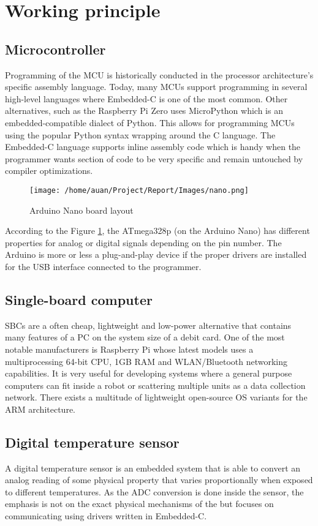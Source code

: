 \section{Working principle}%
\label{sec:working_principle}

\subsection{Microcontroller}%
\label{sub:microcontroller}
Programming of the MCU is historically conducted in the processor architecture's specific assembly language. Today, many MCUs support programming in several high-level languages where Embedded-C is one of the most common. Other alternatives, such as the Raspberry Pi Zero uses MicroPython which is an embedded-compatible dialect of Python. This allows for programming MCUs using the popular Python syntax wrapping around the C language. The Embedded-C language supports inline assembly code which is handy when the programmer wants section of code to be very specific and remain untouched by compiler optimizations.

\begin{figure}[h]
  \centering
  \texttt{[image: /home/auan/Project/Report/Images/nano.png]}
  \caption{Arduino Nano board layout}
  \label{fig:nano}
\end{figure}

According to the Figure \ref{fig:nano}, the ATmega328p (on the Arduino Nano) has different properties for analog or digital signals depending on the pin number. The Arduino is more or less a plug-and-play device if the proper drivers are installed for the USB interface connected to the programmer.

\subsection{Single-board computer}%
\label{sub:single_board_computer}
SBCs are a often cheap, lightweight and low-power alternative that contains many features of a PC on the system size of a debit card. One of the most notable manufacturers is Raspberry Pi whose latest models uses a multiprocessing 64-bit CPU, 1GB RAM and WLAN/Bluetooth networking capabilities. It is very useful for developing systems where a general purpose computers can fit inside a robot or scattering multiple units as a data collection network. There exists a multitude of lightweight open-source OS variants for the ARM architecture.

\subsection{Digital temperature sensor}%
\label{sub:digital_temperature_sensor}
A digital temperature sensor is an embedded system that is able to convert an analog reading of some physical property that varies proportionally when exposed to different temperatures. As the ADC conversion is done inside the sensor, the emphasis is not on the exact physical mechanisms of the but focuses on communicating using drivers written in Embedded-C.

